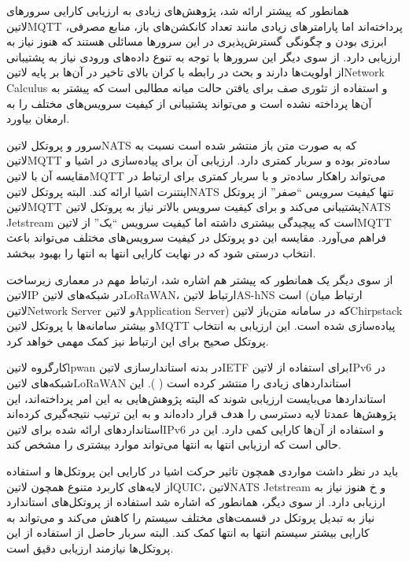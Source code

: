 همانطور که پیشتر ارائه شد، پژوهش‌های زیادی به ارزیابی کارایی سرورهای ‌لاتین{MQTT} پرداخته‌اند اما پارامترهای زیادی مانند تعداد کانکشن‌های باز،
منابع مصرفی، ابرزی بودن و چگونگی گسترش‌پذیری در این سرورها مسائلی هستند که هنوز نیاز به ارزیابی دارد.
از سوی دیگر این سرورها با توجه به تنوع داده‌های ورودی نیاز به پشتیبانی
از اولویت‌ها دارند و بحث در رابطه با کران بالای تاخیر در آن‌ها بر پایه ‌لاتین{Network Calculus}
و استفاده از تئوری صف برای یافتن حالت میانه مطالبی است که پیشتر به آن‌ها پرداخته نشده است و می‌تواند پشتیبانی
از کیفیت سرویس‌های مختلف را به ارمغان بیاورد.

سرور و پروتکل ‌لاتین{NATS} که به صورت متن باز منتشر شده است نسبت به ‌لاتین{MQTT} ساده‌تر بوده و سربار کمتری دارد. ارزیابی آن
برای پیاده‌سازی در اشیا و مقایسه آن با ‌لاتین{MQTT} می‌تواند راهکار ساده‌تر و با سربار کمتری برای ارتباط در اینتنرت اشیا ارائه کند.
البته پروتکل ‌لاتین{NATS} تنها کیفیت سرویس ``صفر'' از پروتکل ‌لاتین{MQTT} پشتیبانی می‌کند و برای کیفیت سرویس بالاتر نیاز به
پروتکل ‌لاتین{NATS Jetstream} است که پیچیدگی بیشتری داشته اما کیفیت سرویس ``یک'' از ‌لاتین{MQTT} فراهم می‌آورد.
مقایسه این دو پروتکل در کیفیت سرویس‌های مختلف می‌تواند باعث انتخاب درستی شود که در نهایت کارایی انتها به انتها را بهبود ببخشد.

از سوی دیگر یک همانطور که پیشتر هم اشاره شد، ارتباط مهم در معماری زیرساخت ‌لاتین{IP} در شبکه‌های ‌لاتین{LoRaWAN}،
ارتباط ‌لاتین{AS-hNS} است (ارتباط میان ‌لاتین{Network Server} و ‌لاتین{Application Server})
که در سامانه متن‌باز ‌لاتین{Chirpstack} و بیشتر سامانه‌ها با پروتکل ‌لاتین{MQTT} پیاده‌سازی شده است.
این ارزیابی به انتخاب پروتکل صحیح برای این ارتباط نیز کمک مهمی خواهد کرد.


کارگروه ‌لاتین{lpwan} در بدنه استاندارسازی ‌لاتین{IETF} برای استفاده از ‌لاتین{IPv6} در شبکه‌های ‌لاتین{LoRaWAN} استانداردهای زیادی را منتشر کرده است ( ).
این استانداردها می‌بایست ارزیابی شوند که البته پژوهش‌هایی به این امر پرداخته‌اند،
این پژوهش‌ها عمدتا لایه دسترسی را هدف قرار داده‌اند و به این ترتیب نتیجه‌گیری کرده‌اند استانداردهای
ارائه شده برای ‌لاتین{IPv6} و استفاده از آن‌ها کارایی کمی دارد. این در حالی است که ارزیابی انتها
به انتها می‌تواند موارد بیشتری را مشخص کند.

باید در نظر داشت مواردی همچون تاثیر حرکت اشیا در کارایی این پروتکل‌ها و استفاده از
لایه‌های کاربرد متنوع همچون ‌لاتین{QUIC}، ‌لاتین{NATS Jetstream} و ‌خ هنوز نیاز به ارزیابی دارد.
از سوی دیگر، همانطور که اشاره شد استفاده از پروتکل‌های استاندارد نیاز به تبدیل پروتکل در قسمت‌های مختلف سیستم را کاهش می‌کند و
می‌تواند به کارایی بیشتر سیستم انتها به انتها کمک کند.
البته سربار حاصل از استفاده از این پروتکل‌ها نیازمند ارزیابی دقیق است.

